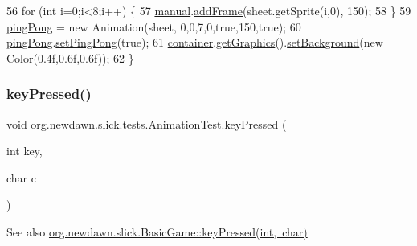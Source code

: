 \begin{DoxyCode}
56         \textcolor{keywordflow}{for} (\textcolor{keywordtype}{int} i=0;i<8;i++) \{
57             \mbox{\hyperlink{classorg_1_1newdawn_1_1slick_1_1tests_1_1_animation_test_a3f8e79b4500cfad2ae6939b2fe0794b0}{manual}}.\mbox{\hyperlink{classorg_1_1newdawn_1_1slick_1_1_animation_ae96843e67072ef3b085072cb0840a8ba}{addFrame}}(sheet.getSprite(i,0), 150);
58         \}
59         \mbox{\hyperlink{classorg_1_1newdawn_1_1slick_1_1tests_1_1_animation_test_a17f3c7b2f9c7241a176dc97e14c2adbb}{pingPong}} = \textcolor{keyword}{new} Animation(sheet, 0,0,7,0,\textcolor{keyword}{true},150,\textcolor{keyword}{true});
60         \mbox{\hyperlink{classorg_1_1newdawn_1_1slick_1_1tests_1_1_animation_test_a17f3c7b2f9c7241a176dc97e14c2adbb}{pingPong}}.\mbox{\hyperlink{classorg_1_1newdawn_1_1slick_1_1_animation_aabdefa9397f19d852b66975d0680f312}{setPingPong}}(\textcolor{keyword}{true});
61         \mbox{\hyperlink{classorg_1_1newdawn_1_1slick_1_1tests_1_1_animation_test_ad2142f4fe5667df82eb8ead44f81e1b1}{container}}.\mbox{\hyperlink{classorg_1_1newdawn_1_1slick_1_1_game_container_a007825fb0bdfca1bc0e102687387fb59}{getGraphics}}().\mbox{\hyperlink{classorg_1_1newdawn_1_1slick_1_1_graphics_a792bcb1d729c35041b99b9eb2211649a}{setBackground}}(\textcolor{keyword}{new} Color(0.4f,0.6f,0.6f));
62     \}
\end{DoxyCode}
\mbox{\label{classorg_1_1newdawn_1_1slick_1_1tests_1_1_animation_test_a263af8181368e67918736e55a4d9a352}} 
\subsubsection{\texorpdfstring{key\+Pressed()}{keyPressed()}}
{\footnotesize\ttfamily void org.\+newdawn.\+slick.\+tests.\+Animation\+Test.\+key\+Pressed (\begin{DoxyParamCaption}\item[{int}]{key,  }\item[{char}]{c }\end{DoxyParamCaption})\hspace{0.3cm}{\ttfamily [inline]}}

\begin{DoxySeeAlso}{See also}
\mbox{\hyperlink{classorg_1_1newdawn_1_1slick_1_1_basic_game_a4fbb3345b5abf5ddd54a99466d07f02f}{org.\+newdawn.\+slick.\+Basic\+Game\+::key\+Pressed(int, char)}} 
\end{DoxySeeAlso}


